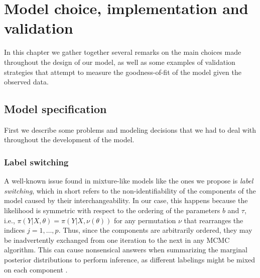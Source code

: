 %
%

\chapter{Model choice, implementation and validation}\label{ch:model-choice}

In this chapter we gather together several remarks on the main choices made throughout the design of our model, as well as some examples of validation strategies that attempt to measure the goodness-of-fit of the model given the observed data.

\section{Model specification}

First we describe some problems and modeling decisions that we had to deal with throughout the development of the model.

\subsection*{Label switching}

A well-known issue found in mixture-like models like the ones we propose is \textit{label switching}, which in short refers to the non-identifiability of the components of the model caused by their interchangeability. In our case, this happens because the likelihood is symmetric with respect to the ordering of the parameters \(b\) and \(\tau\), i.e., \(\pi(Y|X,\theta)=\pi(Y|X, \nu(\theta))\) for any permutation \(\nu\) that rearranges the indices \(j=1,\dots, p\). Thus, since the components are arbitrarily ordered, they may be inadvertently exchanged from one iteration to the next in any MCMC algorithm. This can cause nonsensical answers when summarizing the marginal posterior distributions to perform inference, as different labelings might be mixed on each component \citep{stephens2000dealing}.

